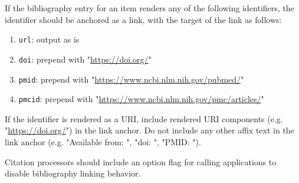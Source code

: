 If the bibliography entry for an item renders any of the following
identifiers, the identifier should be anchored as a link, with the
target of the link as follows:

\begin{enumerate}
\def\labelenumi{\arabic{enumi}.}
\tightlist
\item
  \texttt{url}: output as is
\item
  \texttt{doi}: prepend with "\url{https://doi.org/}"
\item
  \texttt{pmid}: prepend with
  "\url{https://www.ncbi.nlm.nih.gov/pubmed/}"
\item
  \texttt{pmcid}: prepend with
  "\url{https://www.ncbi.nlm.nih.gov/pmc/articles/}"
\end{enumerate}

If the identifier is rendered as a URI, include rendered URI components
(e.g. "\url{https://doi.org/}") in the link anchor. Do not include any
other affix text in the link anchor (e.g. "Available from: ", "doi: ",
"PMID: ").

Citation processors should include an option flag for calling
applications to disable bibliography linking behavior.
